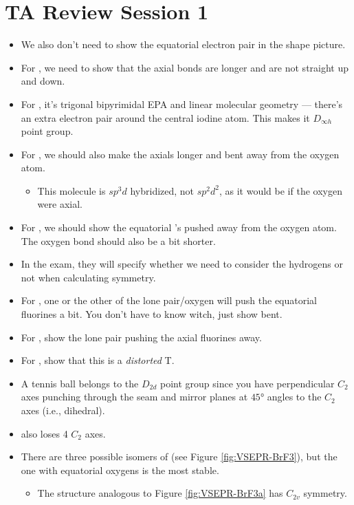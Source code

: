 \documentclass[../notes.tex]{subfiles}
\begin{document}
\section{TA Review Session 1}
\begin{itemize}
    \item {}We also don't need to show the equatorial electron pair in the shape picture.
    \item For , we need to show that the axial bonds are longer and are not straight up and down.
    \item For , it's trigonal bipyrimidal EPA and linear molecular geometry --- there's an extra electron pair around the central iodine atom. This makes it $D_{\infty h}$ point group.
    \item For , we should also make the axials longer and bent away from the oxygen atom.
    \begin{itemize}
        \item This molecule is $sp^3d$ hybridized, not $sp^2d^2$, as it would be if the oxygen were axial.
    \end{itemize}
    \item For , we should show the equatorial 's pushed away from the oxygen atom. The oxygen bond should also be a bit shorter.
    \item In the exam, they will specify whether we need to consider the hydrogens or not when calculating symmetry.
    \item For , one or the other of the lone pair/oxygen will push the equatorial fluorines a bit. You don't have to know witch, just show bent.
    \item For , show the lone pair pushing the axial fluorines away.
    \item For , show that this is a \emph{distorted} T.
    \item A tennis ball belongs to the $D_{2d}$ point group since you have perpendicular $C_2$ axes punching through the seam and mirror planes at $\ang{45}$ angles to the $C_2$ axes (i.e., dihedral).
    \item {} also loses 4 $C_2$ axes.
    \item There are three possible isomers of  (see Figure \ref{fig:VSEPR-BrF3}), but the one with equatorial oxygens is the most stable.
    \begin{itemize}
        \item The structure analogous to Figure \ref{fig:VSEPR-BrF3a} has $C_{2v}$ symmetry.

\end{itemize}
\end{itemize}
\end{document}

